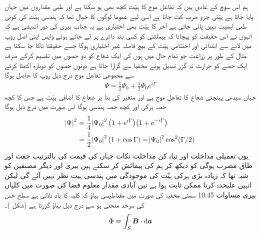  ہم اس سوچ کے عادی ہیں کہ تفاعل موج کا ہیّت کچھ بھی ہو سکتا ہے اور طبی مقداروں میں جہاں  پایا جاتا ہے ہیّتی جزو ضرب کٹ جاتا ہے اسی لیے عموما لوگوں کا خیال تھا کہ ہندسی ہیّت کی کوئی طبی اہمیت نہیں پائی جاتی ہے آخر  کا ہیّت بھی اختیاری ہے یہ جناب بیری کی دور اندیشی ہے کہ انہوں نے اس حقیقت کو پہچانا کہ ہيملٹنی کو کسی بند دائرے پر لے جاتے ہوئے واپس اپنی اصل روپ میں لانے سے ابتدائی اور احتتامی  ہیّت کے بیچ فاصلہ غیر اختیاری ہوگا جسے حقیقتا ناکا جا سکتا ہے مثال کے طور پر زراعت جو تمام حال  میں ہوں کی ایک شعاع کو دو حصوں میں تقسیم کرکے صرف ایک حصے کو حرارت نہ گزر تبدیل ہوتے مخفیا سے گزارا جاتا ہے دونوں حصوں کو دوبارہ اکھٹا کرنے سے مجموعی تفاعل موج درج ذیل روپ کا حاصل ہوگا 
\begin{align}
\Psi = \frac{1}{2} \Psi_0 + \frac{1}{2} \Psi_0 e^{i \Gamma}
\end{align}
جہاں سیدھی پہنچتی شعاع کا تفاعل موج  ہے اور متغیر  کی بنا پر شعاع کا اضافی ہیّت  ہے جس کا کچھ حصہ ہرکی اور کچھ حصہ ہندسی ہوگا اس صورت میں درج ذیل ہوگا 
\begin{align}
\abs{\Psi}^2 &= \frac{1}{4} \abs{\Psi_0}^2 \big ( 1 + e^{i \Gamma} \big ) \big ( 1 + e^{- i \Gamma} \big ) \\
&= \frac{1}{2} \abs{\Psi_0}^2 (1 + \cos \Gamma) = \abs{\Psi_0}^2 \cos^2 (\Gamma/2)
\end{align}
یوں تعمیلی مداخلت اور تباہ کن مداخلت نکات جہاں  کی قیمت  کی بالترتیب جفت اور طاق مضرب ہوگی کو دیکھ کر ہم  کی پیمائش کر سکتے ہیں بیری اور دیگر مصنفین کو شبہ تھا کہ زیادہ بڑی ہرکی ہیّت کی موجودگی میں ہندسی ہيت نظر نہیں آئے گی لیکن انہیں علیحدہ کرنا ممکن ثابت ہوا ہے تین آبادی مقدار معلوم فضا  کی صورت میں کلیاں بیری مساوات 10.45 سمتی مخفیہ  کی صورت میں مقناطیسی بہاؤ کہ کلیہ کا یاد دلاتی ہے سطح  جس کی سرحد منحنی  ہو سے درج ذیل
 بہاؤ گزرتا ہے  (شکل )۔ 
\begin{align}
\Phi \equiv \int_S \kvec{B} \cdot \dif \kvec{a}
\end{align}

